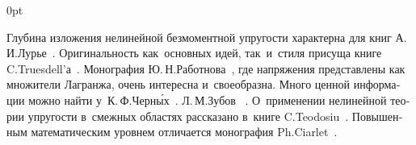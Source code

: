 \begin{changemargin}{\parindent}{0pt}
\fontsize{10}{12}\selectfont

\begin{otherlanguage}{russian}

Глубина изложения нелинейной безмоментной упругости характерна для книг А.\,И.\:Лурье~\cite{lurie-nonlinearelasticity, lurie-theoryofelasticity}.
Оригинальность как~основных идей, так~и~стиля присуща книге C.\:Truesdell’а~\cite{truesdell-firstcourse}.
Монография Ю.\,Н.\:Работнова~\cite{rabotnov-mechanicsofdeformable}, где напряжения представлены как множители Лагранжа, очень интересна и~своеобразна.
Много ценной информации можно найти у~К.\,Ф.\:Черн\'{ы}х~\cite{chernyh-nonlinearelasticity}.
Л.\,М.\:Зубов~\cite{zubov} .
О~применении нелинейной теории упругости в~смежных областях рассказано в~книге C.\:Teodosiu~\cite{teodosiu-crystaldefects}.
Повышенным математическим уровнем отличается монография Ph.\:Ciarlet~\cite{ciarlet-mathematicalelasticity}.
\par

\end{otherlanguage}

\end{changemargin}
